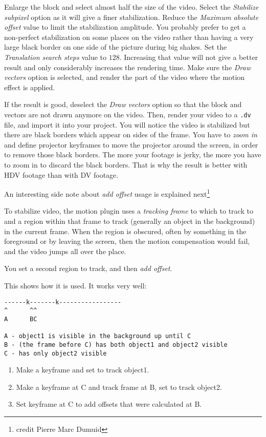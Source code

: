 Enlarge the block and select almost half the size of the video. Select the \textit{Stabilize subpixel} option as it will give a finer stabilization. Reduce the \textit{Maximum absolute offset} value to limit the stabilization amplitude. You probably prefer to get a non-perfect stabilization on some places on the video rather than having a very large black border on one side of the picture during big shakes. Set the \textit{Translation search steps} value to $128$. Increasing that value will not give a better result and only considerably increases the rendering time. Make sure the \textit{Draw vectors} option is selected, and render the part of the video where the motion effect is applied.

If the result is good, deselect the \textit{Draw vectors} option so that the block and vectors are not drawn anymore on the video. Then, render your video to a \texttt{.dv} file, and import it into your project. You will notice the video is stabilized but there are black borders which appear on sides of the frame. You have to \textit{zoom in} and define projector keyframes to move the projector around the screen, in order to remove those black borders. The more your footage is jerky, the more you have to zoom in to discard the black borders. That is why the result is better with HDV footage than with DV footage.

An interesting side note about \textit{add offset} usage is explained next\protect\footnote{credit Pierre Marc Dumuid}

To stabilize video, the motion plugin uses a \textit{tracking frame} to which to track to and a region within that frame to track (generally an object in the background) in the current frame.  When the region is obscured, often by something in the foreground or by leaving the screen, then the motion compensation would fail, and the video jumps all over the place.

You set a second region to track, and then \textit{add offset}.

This shows how it is used.  It works very well:

\begin{verbatim}
------k-------k-----------------
^      ^^
A      BC

A - object1 is visible in the background up until C
B - (the frame before C) has both object1 and object2 visible
C - has only object2 visible
\end{verbatim}

\begin{enumerate}
    \item Make a keyframe and set to track object1.
    \item Make a keyframe at C and track frame at B, set to track object2.
    \item Set keyframe at C to add offsets that were calculated at B.
\end{enumerate}

